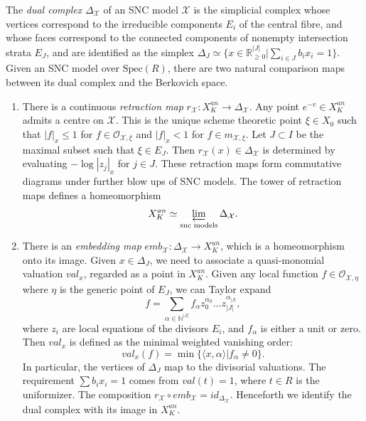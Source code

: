 \documentclass[a4paper]{article}
\theoremstyle{definition}
\newcommand{\R}{\mathbb{R}}
\newcommand{\N}{\mathbb{N}}
\begin{document}
	
	
	
	
	
	
	
	
	
	The \emph{dual complex} $\Delta_{\mathcal{X}}$ of an SNC model $\mathcal{X}$ is the simplicial complex whose vertices correspond to the irreducible components $E_i$ of the central fibre, and whose faces correspond to the connected components of nonempty intersection strata $E_J$, and are identified as the simplex 
	$\Delta_J\simeq \{  x\in \R_{\geq 0}^{|J|}| \sum_{i\in J} b_ix_i=1 \}.
	$
	Given an SNC model over $\text{Spec}(R)$, there are two natural comparison maps between its dual complex and the Berkovich space.
	
	\begin{enumerate}
		\item   There is a continuous \emph{retraction map}  $r_{ \mathcal{X} }: X_K^{an}\to \Delta_{\mathcal{X} } $. 
		Any point $e^{-v}\in X_K^{an}$ admits
		a centre on $\mathcal{X}$. 
		This is the unique scheme theoretic point
		$\xi \in X_0$ such that 
		$|f|_x \leq 1$ for $f\in \mathcal{O}_{\mathcal{X},\xi}$
		and $|f|_x < 1$ for
		$f\in m_{\mathcal{X},\xi}$.
		Let $J \subset I$ 
		be the maximal subset such that
		$\xi\in E_J$. Then
		$r_{ \mathcal{X} }(x) \in \Delta_{\mathcal{X} }$ 
		is determined by evaluating
		$-\log |z_j|_x$ for $j \in J$.
		These retraction maps form commutative diagrams under further blow ups of SNC models.
	 The tower of retraction maps defines a homeomorphism
		\[
		X_K^{an}\simeq  \varprojlim_{\text{snc models} } \Delta_{ \mathcal{X} }.
		\]
	
			
		
		
		\item   There is an \emph{embedding map} $emb_{\mathcal{X}}: \Delta_\mathcal{X}\to X_K^{an}$, which is a homeomorphism onto its image. Given $x\in \Delta_J$, we need to associate a quasi-monomial valuation $val_x$, regarded as a point in $X_K^{an}$. Given any local function $f\in \mathcal{O}_{\mathcal{X},\eta}$ where $\eta$ is the generic point of $E_J$, we can Taylor expand
		\[
		f=\sum_{\alpha\in \N^{|J|}} f_\alpha z_0^{\alpha_0}\ldots z_{|J|}^{\alpha_{|J|}},
		\] 
		where $z_i$ are local equations of the divisors $E_i$, and $f_\alpha$ is either a unit or zero. Then $val_x$ is defined as the minimal weighted vanishing order:
		\[
		val_x(f)= \min\{   \langle x, \alpha\rangle  |  f_\alpha\neq 0  \}.
		\]
		In particular, the vertices of $\Delta_J$ map to the divisorial valuations. The requirement $\sum b_ix_i=1$ comes from $val(t)=1$, where $t\in R$ is the uniformizer. The composition $r_\mathcal{X}\circ emb_\mathcal{X}=id_{\Delta_\mathcal{X}}$.	Henceforth we identify the dual complex with its image in $X_K^{an}$.
		
		
	\end{enumerate}
	
\end{document}
